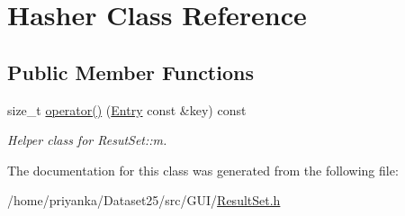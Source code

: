 \hypertarget{classHasher}{\section{\-Hasher \-Class \-Reference}
\label{classHasher}
}
\subsection*{\-Public \-Member \-Functions}
\begin{DoxyCompactItemize}
\item 
\hypertarget{classHasher_a6f581218408d8422c49b6109cc6197af}{size\-\_\-t \hyperlink{classHasher_a6f581218408d8422c49b6109cc6197af}{operator()} (\hyperlink{classEntry}{\-Entry} const \&key) const }\label{classHasher_a6f581218408d8422c49b6109cc6197af}

\begin{DoxyCompactList}\small\item\em \-Helper class for \-Resut\-Set\-::m. \end{DoxyCompactList}\end{DoxyCompactItemize}


\-The documentation for this class was generated from the following file\-:\begin{DoxyCompactItemize}
\item 
/home/priyanka/\-Dataset25/src/\-G\-U\-I/\hyperlink{ResultSet_8h}{\-Result\-Set.\-h}\end{DoxyCompactItemize}
